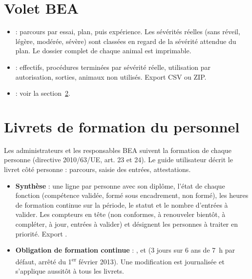 \documentclass[11pt,a4paper]{article}
\begin{document}
\section{Volet BEA}
\begin{itemize}
  \item {} : parcours par essai,
    plan, puis expérience. Les sévérités réelles (sans réveil, légère,
    modérée, sévère) sont classées en regard de la sévérité attendue du
    plan. Le dossier complet de chaque animal est imprimable.
  \item {} :
    effectifs, procédures terminées par sévérité réelle, utilisation par
    autorisation, sorties, animaux non utilisés. Export CSV ou ZIP.
  \item {} : voir la
    section~\ref{sec:livrets}.
\end{itemize}

\section{Livrets de formation du personnel}\label{sec:livrets}
Les administrateurs et les responsables BEA suivent la formation de chaque
personne (directive 2010/63/UE, art. 23 et 24). Le guide utilisateur décrit
le livret côté personne : parcours, saisie des entrées, attestations.


\begin{itemize}
  \item \textbf{Synthèse} : une ligne par personne avec son diplôme, l'état
    de chaque fonction (compétence validée, formé sous encadrement, non
    formé), les heures de formation continue sur la période, le statut et
    le nombre d'entrées à valider. Les compteurs en tête (non conformes, à
    renouveler bientôt, à compléter, à jour, entrées à valider) et
     désignent les personnes à
    traiter en priorité. Export .
  \item \textbf{Obligation de formation continue} : ,
     et  (3 jours sur
    6 ans de 7~h par défaut, arrêté du 1\textsuperscript{er} février 2013).
    Une modification est journalisée et s'applique aussitôt à tous les
    livrets.
\end{itemize}
\end{document}
